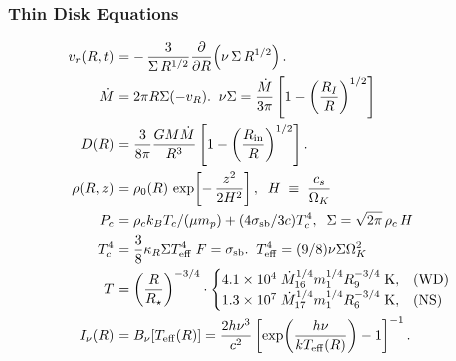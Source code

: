 \begin{multicols}{2}
\subsubsection{Thin Disk Equations}
\[
\begin{aligned}
    v_r(R,t)
&= -\,\frac{3}{\Sigma\,R^{1/2}}
\frac{\partial}{\partial R}\!\left(\nu\,\Sigma\,R^{1/2}\right).\\
  \dot{M} &= 2\pi R \Sigma (-v_R).\;\;\nu\Sigma = \frac{\dot{M}}{3\pi}\left[1 - \left(\frac{R_{I}}{R}\right)^{1/2}\right]\\
  D(R) &= \frac{3}{8\pi}\frac{GM\dot{M}}{R^3}
\left[1 - \left(\frac{R_{\rm in}}{R}\right)^{1/2}\right].\\
\rho(R,z) &= \rho_0(R)\,
\exp\!\left[-\,\frac{z^2}{2H^2}\right],\;\;H \;\equiv\; \frac{c_s}{\Omega_K}\\
P_c &= \rho_c k_B T_c / (\mu m_p) + (4\sigma_{\rm sb}/3c)T_c^4,\;\;\Sigma = \sqrt{2\pi}\,\rho_c\,H\\
T_c^4 &= \frac{3}{8}\kappa_R \Sigma T_{\rm eff}^4\;F = \sigma_{\rm sb}.\;\; T_{\rm eff}^4 = (9/8)\nu\Sigma\Omega_K^2\\
    T &= \left(\frac{R}{R_\star}\right)^{-3/4} \cdot\begin{cases}4.1 \times 10^4\;\dot{M}_{\rm 16}^{1/4} m_1^{1/4} R_9^{-3/4}\;{\rm K},&\text{(WD)}\\
    1.3 \times 10^7\;\dot{M}_{\rm 17}^{1/4} m_1^{1/4} R_6^{-3/4}\;{\rm K},&\text{(NS)}
    \end{cases}\\
    I_\nu(R) &= B_\nu[T_{\rm eff}(R)]
= \frac{2h\nu^3}{c^2}\left[\exp\!\left(\frac{h\nu}{kT_{\rm eff}(R)}\right)-1\right]^{-1}.
\end{aligned}
\]
\end{multicols}


\restoregeometry
